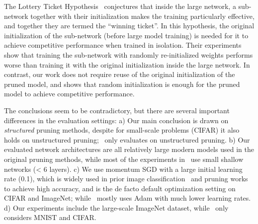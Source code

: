 The Lottery Ticket Hypothesis~\cite{lottery} conjectures that inside the large network, a sub-network together with their initialization makes the training particularly effective, and together they are termed the ``winning ticket''. In this hypothesis, the original initialization of the sub-network (before large model training) is needed for it to achieve competitive performance when trained in isolation. Their experiments show that training the sub-network with randomly re-initialized weights performs worse than training it with the original initialization inside the large network. In contrast, our work does not require reuse of the original initialization of the pruned model, and shows that random initialization is enough for the pruned model to achieve competitive performance. 

The conclusions seem to be contradictory, but there are several important differences in the evaluation settings: a) Our main conclusion is drawn on \emph{structured} pruning methods, despite for small-scale problems (CIFAR) it also holds on unstructured pruning;~\cite{lottery} only evaluates on unstructured pruning. b) Our evaluated network architectures are all relatively large modern models used in the original pruning methods, while most of the experiments in~\cite{lottery} use small shallow networks (< 6 layers). c) We use momentum SGD with a large initial learning rate (0.1), which is widely used in prior image classification~\cite{resnet, densenet} and pruning works~\cite{li2016pruning, liu2017learning, he2017channel, luo2017thinet, he2018sfp, huang2018data} to achieve high accuracy, and is the de facto default optimization setting on CIFAR and ImageNet; while~\cite{lottery} mostly uses Adam with much lower learning rates. d) Our experiments include the large-scale ImageNet dataset, while~\cite{lottery} only considers MNIST and CIFAR.


